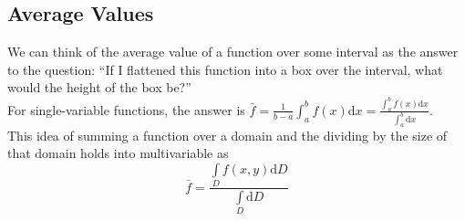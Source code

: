 \subsection{Average Values}
\noindent
We can think of the average value of a function over some interval as the answer to the question: “If I flattened this function into a box over the interval, what would the height of the box be?”\\
For single-variable functions, the answer is $\bar{f} = \frac{1}{b-a}\int_{a}^{b}{f(x)\mathrm{d}x} = \frac{\int_{a}^{b}{f(x)\mathrm{d}x}}{\int_{a}^{b}{\mathrm{d}x}}$.\\
This idea of summing a function over a domain and the dividing by the size of that domain holds into multivariable as
\begin{equation*}
	\bar{f} = \frac{\int\limits_{D}{f(x,y)\mathrm{d}D}}{\int\limits_{D}{\mathrm{d}D}}
\end{equation*}

